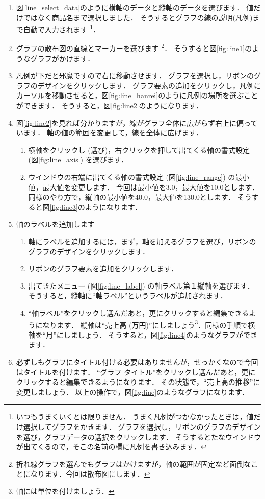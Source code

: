 \begin{enumerate}
    \item 図\ref{line_select_data}のように横軸のデータと縦軸のデータを選びます．
    値だけではなく商品名まで選択しました．
    そうするとグラフの線の説明(凡例)まで自動で入力されます
    \footnote{いつもうまくいくとは限りません．
      うまく凡例がつかなかったときは，値だけ選択してグラフをかきます．
      グラフを選択し，リボンのグラフのデザインを選び，グラフデータの選択をクリックします．
      そうするとたなウインドウが出てくるので，そこの名前の欄に凡例を書き込みます．}．
    \item グラフの散布図の直線とマーカーを選びます
    \footnote{折れ線グラフを選んでもグラフはかけますが，軸の範囲が固定など面倒なことになります．今回は散布図にします．}．
    そうすると図\ref{fig:line1}のようなグラフがかけます．
    \item 凡例が下だと邪魔ですので右に移動させます．
    グラフを選択し，リボンのグラフのデザインをクリックします．
    グラフ要素の追加をクリックし，凡例にカーソルを移動させると，図\ref{fig:line_hanrei}のように凡例の場所を選ぶことができます．
    そうすると，図\ref{fig:line2}のようになります．
    \item 図\ref{fig:line2}を見れば分かりますが，線がグラフ全体に広がらず右上に偏っています．
    軸の値の範囲を変更して，線を全体に広げます．
    \begin{enumerate}
        \item 横軸をクリックし (選び)，右クリックを押して出てくる軸の書式設定 (図\ref{fig:line_axis}) を選びます．
        \item ウインドウの右端に出てくる軸の書式設定 (図\ref{fig:line_range}) の最小値，最大値を変更します．
        今回は最小値を3.0，最大値を10.0とします．
        同様のやり方で，縦軸の最小値を40.0，最大値を130.0とします．
        そうすると図\ref{fig:line3}のようになります．
    \end{enumerate}
    \item 軸のラベルを追加します
    \begin{enumerate}
        \item 軸にラベルを追加するには，まず，軸を加えるグラフを選び，リボンのグラフのデザインをクリックします．
        \item リボンのグラフ要素を追加をクリックします．
        \item 出てきたメニュー (図\ref{fig:line_label}) の軸ラベル第１縦軸を選びます．
        そうすると，縦軸に``軸ラベル''というラベルが追加されます．
        \item ``軸ラベル''をクリックし選んだあと，更にクリックすると編集できるようになります．
        縦軸は``売上高 (万円)''にしましょう\footnote{軸には単位を付けましょう．}．同様の手順で横軸を``月''にしましょう．
        そうすると，図\ref{fig:line4}のようなグラフができます．
    \end{enumerate}
    \item 必ずしもグラフにタイトル付ける必要はありませんが，せっかくなので今回はタイトルを付けます．
    ``グラフ タイトル''をクリックし選んだあと，更にクリックすると編集できるようになります．
    その状態で，``売上高の推移''に変更しましょう．
    以上の操作で，図\ref{fig:line}のようなグラフになります．
\end{enumerate}

